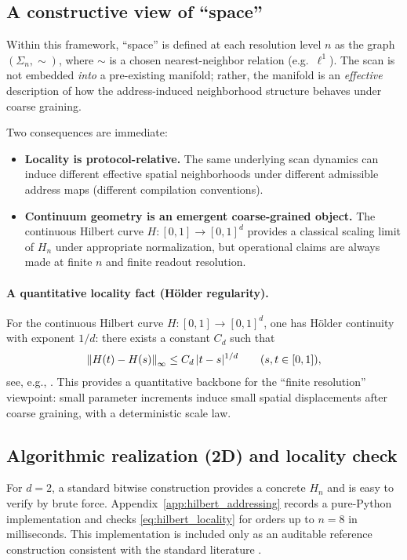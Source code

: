 \subsection{A constructive view of ``space''}
\label{sec:space_as_addressing}

Within this framework, ``space'' is defined at each resolution level $n$ as the graph $(\Sigma_n,\sim)$, where $\sim$ is a chosen nearest-neighbor relation (e.g.\ $\ell^1$).
The scan is not embedded \emph{into} a pre-existing manifold; rather, the manifold is an \emph{effective} description of how the address-induced neighborhood structure behaves under coarse graining.

Two consequences are immediate:
\begin{itemize}
\item \textbf{Locality is protocol-relative.}
The same underlying scan dynamics can induce different effective spatial neighborhoods under different admissible address maps (different compilation conventions).
\item \textbf{Continuum geometry is an emergent coarse-grained object.}
The continuous Hilbert curve $H:[0,1]\to[0,1]^d$ provides a classical scaling limit of $H_n$ under appropriate normalization, but operational claims are always made at finite $n$ and finite readout resolution.
\end{itemize}

\paragraph{A quantitative locality fact (H\"older regularity).}
For the continuous Hilbert curve $H:[0,1]\to[0,1]^d$, one has H\"older continuity with exponent $1/d$:
there exists a constant $C_d$ such that
\[
\left\lVert H(t)-H(s)\right\rVert_\infty \le C_d\,|t-s|^{1/d}
\qquad (s,t\in[0,1]),
\]
see, e.g., \cite{Sagan1994}.
This provides a quantitative backbone for the ``finite resolution'' viewpoint: small parameter increments induce small spatial displacements after coarse graining, with a deterministic scale law.

\subsection{Algorithmic realization (2D) and locality check}
\label{sec:hilbert_algorithm}

For $d=2$, a standard bitwise construction provides a concrete $H_n$ and is easy to verify by brute force.
Appendix~\ref{app:hilbert_addressing} records a pure-Python implementation and checks \eqref{eq:hilbert_locality} for orders up to $n=8$ in milliseconds.
This implementation is included only as an auditable reference construction consistent with the standard literature \cite{Sagan1994}.


